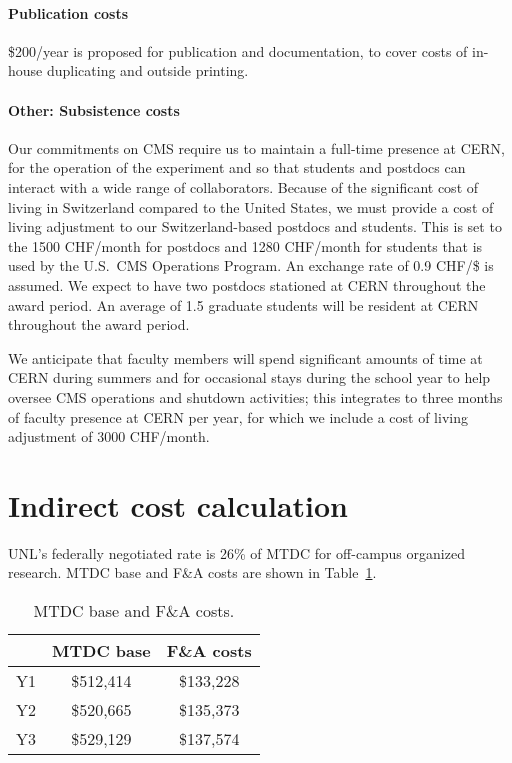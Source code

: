\documentclass[11pt]{article}
\begin{document}
\paragraph{Publication costs} \$200/year is proposed for publication and
documentation, to cover costs of in-house duplicating and outside printing.

\paragraph{Other: Subsistence costs} Our commitments on CMS require us to
maintain a full-time presence at CERN, for the operation of the experiment
and so that students and postdocs can interact with a wide range of
collaborators.  Because of the significant cost of living in Switzerland
compared to the United States, we must provide a cost of living adjustment
to our Switzerland-based postdocs and students.  This is set to the 1500
CHF/month for postdocs and 1280 CHF/month for students that is used by the
U.S.~CMS Operations Program.  An exchange rate of 0.9 CHF/\$ is assumed.
We expect to have two postdocs stationed at CERN throughout the award
period.  An average of 1.5 graduate students will be resident at CERN
throughout the award period.

We anticipate that faculty members will spend significant amounts of time
at CERN during summers and for occasional stays during the school year to
help oversee CMS operations and shutdown activities; this integrates to three
months of faculty presence at CERN per year, for which we include a cost of
living adjustment of 3000 CHF/month.

\section{Indirect cost calculation} UNL's federally
negotiated rate is 26\% of MTDC for off-campus organized research.  MTDC base and F\&A costs are shown in Table~\ref{tab:MTDC}.

\begin{table}[h]
\centering
\begin{tabular}{ccc}\hline
 & MTDC base  & F\&A costs \\\hline
Y1 & \$512,414 & \$133,228 \\ 
Y2 & \$520,665 & \$135,373 \\ 
Y3 & \$529,129 & \$137,574 \\ \hline
\end{tabular}
\caption{MTDC base and F\&A costs.} 
\label{tab:MTDC}
\end{table}
\end{document}
